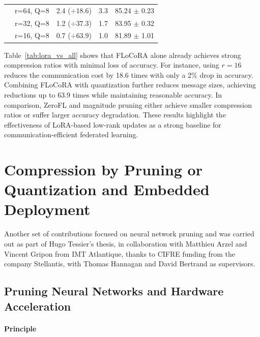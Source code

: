 \documentclass[11pt]{report}
\begin{document}
\begin{table}[h]
{{\begin{tabular}{ccccc}
                                                                        & r=64, Q=8              & 2.4 ($\div 18.6$)          & 3.3               & 85.24 $\pm$ 0.23       \\
                                                                        & r=32, Q=8              & 1.2 ($\div 37.3$)          & 1.7               & 83.95 $\pm$ 0.32       \\
                                                                        & r=16, Q=8              & 0.7 ($\div 63.9$)          & 1.0               & 81.89 $\pm$ 1.01       \\ \hline
      \end{tabular}
    }}
\end{table}

Table~\ref{tab:lora_vs_all} shows that FLoCoRA alone already achieves strong compression ratios with minimal loss of accuracy. For instance, using $r=16$ reduces the communication cost by 18.6 times with only a 2\% drop in accuracy. Combining FLoCoRA with quantization further reduces message sizes, achieving reductions up to 63.9 times while maintaining reasonable accuracy. In comparison, ZeroFL and magnitude pruning either achieve smaller compression ratios or suffer larger accuracy degradation. These results highlight the effectiveness of LoRA-based low-rank updates as a strong baseline for communication-efficient federated learning.

\newpage
\section{Compression by Pruning or Quantization and Embedded Deployment}
\label{sec:compression}



Another set of contributions focused on neural network pruning and was carried out as part of Hugo Tessier's thesis, in collaboration with Matthieu Arzel and Vincent Gripon from IMT Atlantique, thanks to CIFRE funding from the company Stellantis, with Thomas Hannagan and David Bertrand as supervisors.

\subsection{Pruning Neural Networks and Hardware Acceleration}

\paragraph{Principle}
\end{document}

